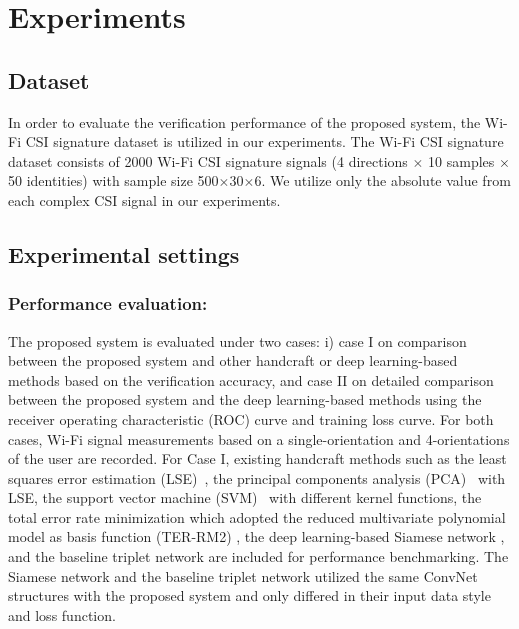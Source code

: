 \documentclass[sigconf]{acmart}
\begin{document}
\section{Experiments}

\subsection{Dataset}
 In order to evaluate the verification performance of the proposed system, the Wi-Fi CSI signature dataset \cite{moon2017air} is utilized in our experiments. The Wi-Fi CSI signature dataset consists of 2000 Wi-Fi CSI signature signals (4 directions $\times$ 10 samples $\times$ 50 identities) with sample size 500$\times$30$\times$6. We utilize only the absolute value from each complex CSI signal in our experiments.

\subsection{Experimental settings}

\subsubsection{Performance evaluation:}
The proposed system is evaluated under two cases: i) case I on comparison between the proposed system and other handcraft or deep learning-based methods based on the verification accuracy, and case II on detailed comparison between the proposed system and the deep learning-based methods using the receiver operating characteristic (ROC) curve and training loss curve. For both cases, Wi-Fi signal measurements based on a single-orientation and 4-orientations of the user are recorded. For Case I, existing handcraft methods such as the least squares error estimation (LSE)~\cite{duda2012pattern}, the principal components analysis (PCA)~\cite{turk1991eigenfaces} with LSE, the support vector machine (SVM)~\cite{vapnik2013nature} with different kernel functions, the total error rate minimization which adopted the reduced multivariate polynomial model as basis function (TER-RM2) \cite{toh2003fingerprint,toh2008between}, the deep learning-based Siamese network \cite{koch2015siamese}, and the baseline triplet network \cite{hoffer2015deep} are included for performance benchmarking. The Siamese network and the baseline triplet network utilized the same ConvNet structures with the proposed system and only differed in their input data style and loss function.
\end{document}
